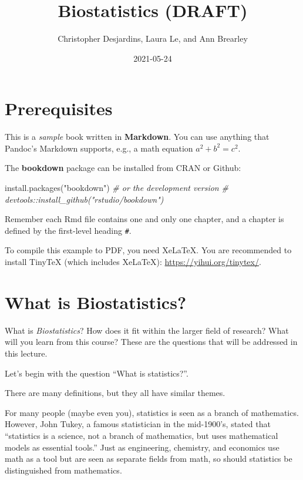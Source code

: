 \documentclass[
]{book}
\title{Biostatistics (DRAFT)}
\author{Christopher Desjardins, Laura Le, and Ann Brearley}
\date{2021-05-24}
\newenvironment{Shaded}{\begin{snugshade}}{\end{snugshade}}
\newcommand{\CommentTok}[1]{\textcolor[rgb]{0.56,0.35,0.01}{\textit{#1}}}
\newcommand{\FunctionTok}[1]{\textcolor[rgb]{0.00,0.00,0.00}{#1}}
\newcommand{\NormalTok}[1]{#1}
\newcommand{\StringTok}[1]{\textcolor[rgb]{0.31,0.60,0.02}{#1}}
\begin{document}
\maketitle

{
\setcounter{tocdepth}{1}
\tableofcontents
}
\hypertarget{prerequisites}{%
\chapter{Prerequisites}\label{prerequisites}}

This is a \emph{sample} book written in \textbf{Markdown}. You can use anything that Pandoc's Markdown supports, e.g., a math equation \(a^2 + b^2 = c^2\).

The \textbf{bookdown} package can be installed from CRAN or Github:

\begin{Shaded}
\begin{Highlighting}[]
\FunctionTok{install.packages}\NormalTok{(}\StringTok{"bookdown"}\NormalTok{)}
\CommentTok{\# or the development version}
\CommentTok{\# devtools::install\_github("rstudio/bookdown")}
\end{Highlighting}
\end{Shaded}

Remember each Rmd file contains one and only one chapter, and a chapter is defined by the first-level heading \texttt{\#}.

To compile this example to PDF, you need XeLaTeX. You are recommended to install TinyTeX (which includes XeLaTeX): \url{https://yihui.org/tinytex/}.

\hypertarget{what-is-biostatistics}{%
\chapter{What is Biostatistics?}\label{what-is-biostatistics}}

What is \emph{Biostatistics}? How does it fit within the larger field of research? What will you learn from this course? These are the questions that will be addressed in this lecture.

Let's begin with the question ``What is statistics?''.

There are many definitions, but they all have similar themes.

For many people (maybe even you), statistics is seen as a branch of mathematics. However, John Tukey, a famous statistician in the mid-1900's, stated that ``statistics is a science, not a branch of mathematics, but uses mathematical models as essential tools.'' Just as engineering, chemistry, and economics use math as a tool but are seen as separate fields from math, so should statistics be distinguished from mathematics.
\end{document}
